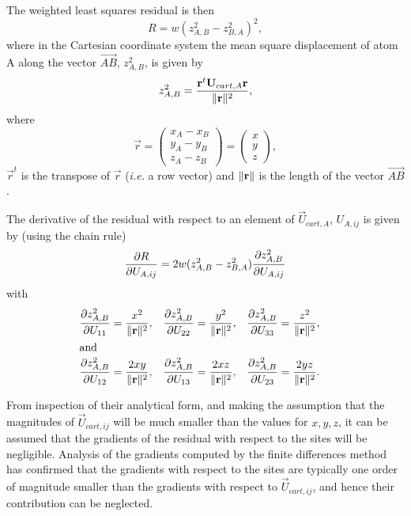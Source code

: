 \documentclass[12pt]{article}
\begin{document}
The weighted least squares residual is then
\begin{equation}
R = w(z^2_{A,B} - z^2_{B,A})^2,
\end{equation}
where in the Cartesian coordinate system the mean square displacement of atom A
along the vector $\overrightarrow{AB}$, $z^2_{A,B}$, is given by
\begin{equation}
z^2_{A,B} = \frac{\mathbf{r}^t\mathbf{U}_{cart,A}\mathbf{r}}{\| \mathbf{r} \|^2},
\end{equation}
where
\begin{equation}
\vec{r} = \begin{pmatrix} x_A - x_B\\y_A - y_B\\z_A - z_B \end{pmatrix}
= \begin{pmatrix} x\\y\\z \end{pmatrix},
\end{equation}
$\vec{r}^t$ is the transpose of $\vec{r}$ (\textit{i.e.} a row vector) and
$\| \mathbf{r} \|$ is the length of the vector $\overrightarrow{AB}$.

The derivative of the residual with respect to an element of $\vec{U}_{cart,A}$,
$U_{A,ij}$ is given by (using the chain rule)
\begin{equation}
\frac{\partial R}{\partial U_{A,ij}} 
=2w(z^2_{A,B} - z^2_{B,A}) \frac{\partial z^2_{A,B}}{\partial U_{A,ij}}\label{eqn:u_derivative}
\end{equation}
with
\begin{align}
\frac{\partial z^2_{A,B}}{\partial U_{11}} &= \frac{x^2}{\| \mathbf{r} \|^2} ,&
\frac{\partial z^2_{A,B}}{\partial U_{22}} &= \frac{y^2}{\| \mathbf{r} \|^2} ,&
\frac{\partial z^2_{A,B}}{\partial U_{33}} &= \frac{z^2}{\| \mathbf{r} \|^2} ,&
\\
\intertext{and}
\frac{\partial z^2_{A,B}}{\partial U_{12}} &= \frac{2xy}{\| \mathbf{r} \|^2} ,&
\frac{\partial z^2_{A,B}}{\partial U_{13}} &= \frac{2xz}{\| \mathbf{r} \|^2} ,&
\frac{\partial z^2_{A,B}}{\partial U_{23}} &= \frac{2yz}{\| \mathbf{r} \|^2} .
\end{align}

From inspection of their analytical form, and making the assumption that the magnitudes of $\vec{U}_{cart,ij}$ will be much smaller than the values for $x, y, z$, it can be assumed that the gradients of the residual with respect to the sites will be negligible.  Analysis of the gradients computed by the finite differences method has confirmed that the gradients with respect to the sites are typically one order of magnitude smaller than the gradients with respect to $\vec{U}_{cart,ij}$, and hence their contribution can be neglected.
\end{document}
